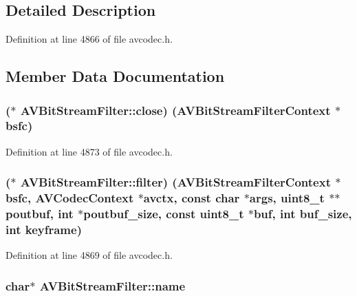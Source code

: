 \subsection{Detailed Description}


Definition at line 4866 of file avcodec.\+h.



\subsection{Member Data Documentation}
\subsubsection[{\texorpdfstring{close}{close}}]{($\ast$ A\+V\+Bit\+Stream\+Filter\+::close) ({\bf A\+V\+Bit\+Stream\+Filter\+Context} $\ast$bsfc)}\hypertarget{struct_a_v_bit_stream_filter_a7f5d4dcbfd472a3fa73f1bb13a41c491}{}\label{struct_a_v_bit_stream_filter_a7f5d4dcbfd472a3fa73f1bb13a41c491}


Definition at line 4873 of file avcodec.\+h.

\subsubsection[{\texorpdfstring{filter}{filter}}]{($\ast$ A\+V\+Bit\+Stream\+Filter\+::filter) ({\bf A\+V\+Bit\+Stream\+Filter\+Context} $\ast$bsfc, {\bf A\+V\+Codec\+Context} $\ast$avctx, {\bf const} char $\ast$args, {\bf uint8\+\_\+t} $\ast$$\ast$poutbuf, {\bf int} $\ast$poutbuf\+\_\+size, {\bf const} {\bf uint8\+\_\+t} $\ast${\bf buf}, {\bf int} buf\+\_\+size, {\bf int} keyframe)}\hypertarget{struct_a_v_bit_stream_filter_a2f63b65bba916ee884a35cff42636882}{}\label{struct_a_v_bit_stream_filter_a2f63b65bba916ee884a35cff42636882}


Definition at line 4869 of file avcodec.\+h.

\subsubsection[{\texorpdfstring{name}{name}}]{ char$\ast$ A\+V\+Bit\+Stream\+Filter\+::name}\hypertarget{struct_a_v_bit_stream_filter_a33c3cb51bd13060da35481655b41e4e5}{}\label{struct_a_v_bit_stream_filter_a33c3cb51bd13060da35481655b41e4e5}


